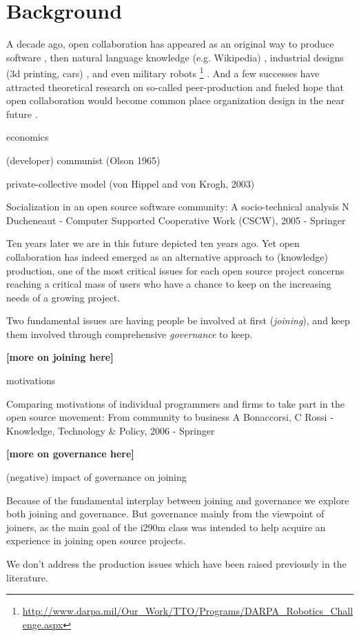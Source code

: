 \section{Background}

A decade ago, open collaboration has appeared as an original way to produce software \cite{}, then natural language knowledge (e.g. Wikipedia) , industrial designs (3d printing, cars) \cite{pearce2012}, and even military robots \footnote{\url{http://www.darpa.mil/Our_Work/TTO/Programs/DARPA_Robotics_Challenge.aspx}} . And a few successes have attracted theoretical research on so-called peer-production and fueled hope that open collaboration would become common place organization design in the near future \cite{benkler2002}. 

economics \cite{lerner2002}

(developer) communist (Olson 1965)

private-collective model (von Hippel and von Krogh, 2003)


Socialization in an open source software community: A socio-technical analysis
N Ducheneaut - Computer Supported Cooperative Work (CSCW), 2005 - Springer




Ten years later we are in this future depicted ten years ago. Yet open collaboration has indeed emerged as an alternative approach to (knowledge) production, one of the most critical issues for each open source project concerns reaching a critical mass of users who have a chance to keep on the increasing needs of a growing project. 

Two fundamental issues are having people be involved at first ({\it joining}), and keep them involved through comprehensive {\it governance} to keep.

{\bf [more on joining here]}

motivations

Comparing motivations of individual programmers and firms to take part in the open source movement: From community to business
A Bonaccorsi, C Rossi - Knowledge, Technology \& Policy, 2006 - Springer


{\bf [more on governance here]} 

 \cite{O'Mahony2007}

(negative) impact of governance on joining \cite{halfacker2013}

Because of the fundamental interplay between joining and governance we explore both joining and governance. But governance mainly from the viewpoint of joiners, as the main goal of the i290m class was intended to help acquire an experience in joining open source projects.

We don't address the production issues which have been raised previously in the literature.


